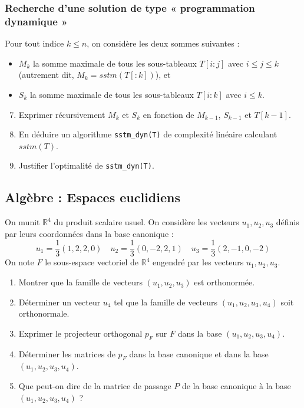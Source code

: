 \documentclass{article}
\begin{document}
\subsubsection{Recherche d'une solution de type « programmation dynamique »}

Pour tout indice $k \le n$, on considère les deux sommes suivantes :
\begin{itemize}
    \item $M_k$ la somme maximale de tous les sous-tableaux $T[i:j]$ avec $i \le j \le k$ (autrement dit, $M_k = sstm(T[:k])$), et
    \item $S_k$ la somme maximale de tous les sous-tableaux $T[i:k]$ avec $i \le k$.
\end{itemize}

\begin{enumerate}
    \setcounter{enumi}{6}
    \item Exprimer récursivement $M_k$ et $S_k$ en fonction de $M_{k-1}$, $S_{k-1}$ et $T[k - 1]$.
    
    \item En déduire un algorithme \texttt{sstm\_dyn(T)} de complexité linéaire calculant $sstm(T)$.
    
    \item Justifier l'optimalité de \texttt{sstm\_dyn(T)}.
\end{enumerate}

\subsection{Algèbre : Espaces euclidiens}
On munit $\mathbb{R}^4$ du produit scalaire usuel. On considère les vecteurs $u_1, u_2, u_3$ définis par leurs coordonnées dans la base canonique :
\[ u_1 = \frac{1}{3}(1, 2, 2, 0) \quad u_2 = \frac{1}{3}(0, -2, 2, 1) \quad u_3 = \frac{1}{3}(2, -1, 0, -2) \]
On note $F$ le sous-espace vectoriel de $\mathbb{R}^4$ engendré par les vecteurs $u_1, u_2, u_3$.

\begin{enumerate}
    \item Montrer que la famille de vecteurs $(u_1, u_2, u_3)$ est orthonormée.
    \item Déterminer un vecteur $u_4$ tel que la famille de vecteurs $(u_1, u_2, u_3, u_4)$ soit orthonormale.
    \item Exprimer le projecteur orthogonal $p_F$ sur $F$ dans la base $(u_1, u_2, u_3, u_4)$.
    \item Déterminer les matrices de $p_F$ dans la base canonique et dans la base $(u_1, u_2, u_3, u_4)$.
    \item Que peut-on dire de la matrice de passage $P$ de la base canonique à la base $(u_1, u_2, u_3, u_4)$ ?
\end{enumerate}
\end{document}
